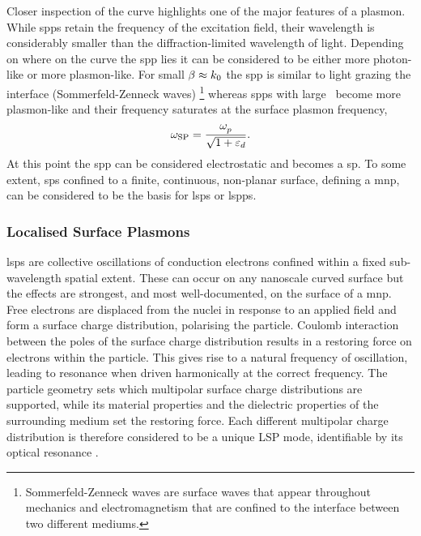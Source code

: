 \documentclass{article}
\begin{document}
Closer inspection of the curve highlights one of the major features of a plasmon. While \glspl{spp} retain the frequency of the excitation field, their wavelength is considerably smaller than the diffraction-limited wavelength of light.
Depending on where on the curve the \gls{spp} lies it can be considered to be either more photon-like or more plasmon-like. For small $\beta\approx k_0$ the \gls{spp} is similar to light grazing the interface (Sommerfeld-Zenneck waves)%
\footnote{Sommerfeld-Zenneck waves are surface waves that appear throughout mechanics and electromagnetism that are confined to the interface between two different mediums.}
whereas \glspl{spp} with large \wvm\ become more plasmon-like and their frequency saturates at the surface plasmon frequency,
\begin{equation}
	\omega_{\mathrm{SP}} = \frac{\omega_{p}^{}}{\sqrt{1+\varepsilon_d}}.
\end{equation}
At this point the \gls{spp} can be considered electrostatic and becomes a \gls{sp}. To some extent, \glspl{sp} confined to a finite, continuous, non-planar surface, defining a \gls{mnp}, can be considered to be the basis for \glspl{lsp} or \glspl{lspp}.

\subsubsection{Localised Surface Plasmons}

\Glspl{lsp} are collective oscillations of conduction electrons confined within a fixed sub-wavelength spatial extent. These can occur on any nanoscale curved surface but the effects are strongest, and most well-documented, on the surface of a \gls{mnp}. Free electrons are displaced from the nuclei in response to an applied field and form a surface charge distribution, polarising the particle. Coulomb interaction between the poles of the surface charge distribution results in a restoring force on electrons within the particle. This gives rise to a natural frequency of oscillation, leading to resonance when driven harmonically at the correct frequency. The particle geometry sets which multipolar surface charge distributions are supported, while its material properties and the dielectric properties of the surrounding medium set the restoring force. Each different multipolar charge distribution is therefore considered to be a unique LSP mode, identifiable by its optical resonance \cite{murray2007}.
\end{document}
